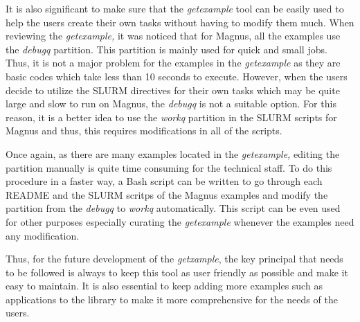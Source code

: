 It is also significant to make sure that the \emph{getexample} tool can be easily used to help the users create their own tasks without having to modify them
much. When reviewing the \emph{getexample,} it was noticed that for Magnus, all the examples use the \emph{debugq} partition. This partition is mainly used
for quick and small jobs. Thus, it is not a major problem for the examples in the \emph{getexample} as they are basic codes which take less than 10 seconds 
to execute. However, when the users decide to utilize the SLURM directives for their own tasks which may be quite large and slow to run on Magnus, the 
\emph{debugq} is not a suitable option. For this reason, it is a better idea to use the \emph{workq} partition in the SLURM scripts for Magnus and thus,
this requires modifications in all of the scripts.

Once again, as there are many examples located in the \emph{getexample,} editing the partition manually is quite time consuming for the technical staff. To do 
this procedure in a faster way, a Bash script can be written to go through each README and the SLURM scritps of the Magnus examples and modify the 
partition from the \emph{debugq} to \emph{workq} automatically. This script can be even used for other purposes especially curating the \emph{getexample} 
whenever the examples need any modification.   

Thus, for the future development of the \emph{getxample}, the key principal that needs to be followed is always to keep this tool as user friendly as possible 
and make it easy to maintain. It is also essential to keep adding more examples such as applications to the library to make it more comprehensive for 
the needs of the users. 
